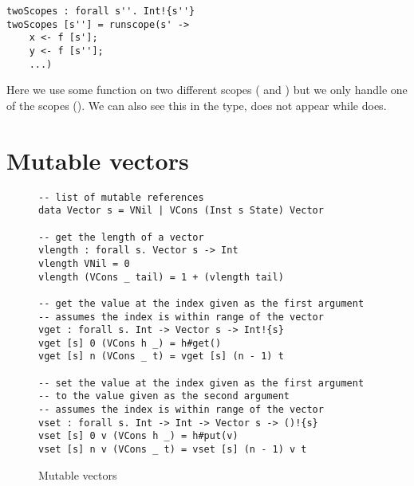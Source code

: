 \begin{verbatim}
twoScopes : forall s''. Int!{s''}
twoScopes [s''] = runscope(s' ->
	x <- f [s'];
	y <- f [s''];
	...)
\end{verbatim}

Here we use some function  on two different scopes ( and ) but we only handle one of the scopes ().
We can also see this in the type,  does not appear while  does. 

\section{Mutable vectors}
\begin{figure}[h]
\caption{Mutable vectors}
\begin{verbatim}
-- list of mutable references
data Vector s = VNil | VCons (Inst s State) Vector

-- get the length of a vector
vlength : forall s. Vector s -> Int
vlength VNil = 0
vlength (VCons _ tail) = 1 + (vlength tail)

-- get the value at the index given as the first argument
-- assumes the index is within range of the vector
vget : forall s. Int -> Vector s -> Int!{s}
vget [s] 0 (VCons h _) = h#get()
vget [s] n (VCons _ t) = vget [s] (n - 1) t

-- set the value at the index given as the first argument
-- to the value given as the second argument
-- assumes the index is within range of the vector
vset : forall s. Int -> Int -> Vector s -> ()!{s}
vset [s] 0 v (VCons h _) = h#put(v)
vset [s] n v (VCons _ t) = vset [s] (n - 1) v t
\end{verbatim}
\label{fig:vectors}
\end{figure}

